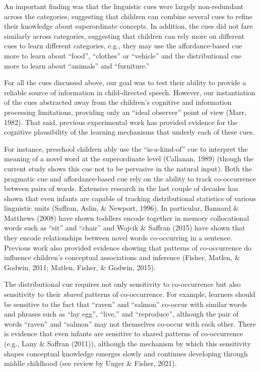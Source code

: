 \documentclass[english,,man,floatsintext]{apa6}
\begin{document}
An important finding was that the linguistic cues were largely non-redundant across the categories, suggesting that children can combine several cues to refine their knowledge about superordinate concepts. In addition, the cues did not fare similarly across categories, suggesting that children can rely more on different cues to learn different categories, e.g., they may use the affordance-based cue more to learn about \enquote{food}, \enquote{clothes} or \enquote{vehicle} and the distributional cue more to learn about \enquote{animals} and \enquote{furniture.}

For all the cues discussed above, our goal was to test their ability to provide a reliable source of information in child-directed speech. However, our instantiation of the cues abstracted away from the children's cognitive and information processing limitations, providing only an \enquote{ideal observer} point of view (Marr, 1982). That said, previous experimental work has provided evidence for the cognitive plausibility of the learning mechanisms that underly each of these cues.

For instance, preschool children ably use the \enquote{is-a-kind-of} cue to interpret the meaning of a novel word at the superordinate level (Callanan, 1989) (though the current study shows this cue not to be pervasive in the natural input). Both the pragmatic cue and affordance-based cue rely on the ability to track co-occurrence between pairs of words. Extensive research in the last couple of decades has shown that even infants are capable of tracking distributional statistics of various linguistic units (Saffran, Aslin, \& Newport, 1996). In particular, Bannard \& Matthews (2008) have shown toddlers encode together in memory collocational words such as \enquote{sit} and \enquote{chair} and Wojcik \& Saffran (2015) have shown that they encode relationships between novel words co-occurring in a sentence. Previous work also provided evidence showing that patterns of co-occurrence do influence children's conceptual associations and inference (Fisher, Matlen, \& Godwin, 2011; Matlen, Fisher, \& Godwin, 2015).

The distributional cue requires not only sensitivity to co-occurrence but also sensitivity to their \emph{shared} patterns of co-occurrence. For example, learners should be sensitive to the fact that \enquote{raven} and \enquote{salmon} co-occur with similar words and phrases such as \enquote{lay egg}, \enquote{live,} and \enquote{reproduce}, although the pair of words \enquote{raven} and \enquote{salmon} may not themselves co-occur with each other. There is evidence that even infants are sensitive to shared patterns of co-occurrence (e.g., Lany \& Saffran (2011)), although the mechanism by which this sensitivity shapes conceptual knowledge emerges slowly and continues developing through middle childhood (see review by Unger \& Fisher, 2021).
\end{document}
